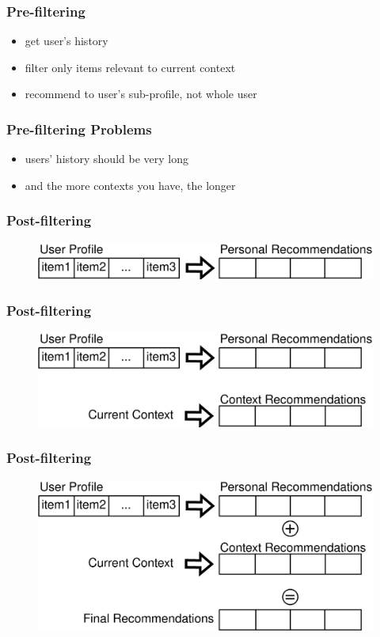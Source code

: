 \documentclass{beamer}
\begin{document}
\begin{frame}
  \frametitle{Pre-filtering}
  \begin{itemize}
  \item get user's history
  \item filter only items relevant to current context
  \item recommend to user's sub-profile, not whole user
  \end{itemize}
\end{frame}
\begin{frame}
  \frametitle{Pre-filtering Problems}
  \begin{itemize}
  \item users' history should be very long
  \item and the more contexts you have, the longer
  \end{itemize}
\end{frame}
\begin{frame}
  \frametitle{Post-filtering}
\begin{figure}
\includegraphics[scale=0.2]{post-filtering1}
\end{figure}
\end{frame}
\begin{frame}
  \frametitle{Post-filtering}
\begin{figure}
\includegraphics[scale=0.2]{post-filtering2}
\end{figure}
\end{frame}
\begin{frame}
  \frametitle{Post-filtering}
\begin{figure}
\includegraphics[scale=0.2]{post-filtering3}
\end{figure}
\end{frame}
\end{document}
